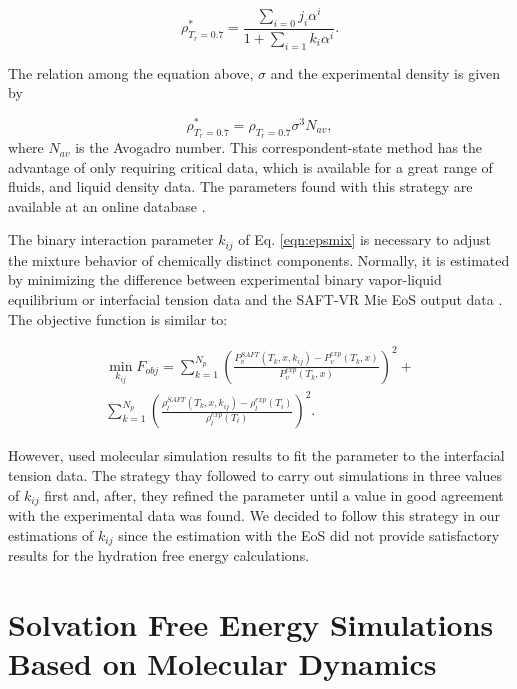 	\begin{equation}
	\rho_{T_{r}=0.7}^{*} = \frac{\sum_{i=0} j_{i}\alpha^{i}}{1+\sum_{i=1} k_{i}\alpha^{i}} .
	\label{eqn:denscorre}
	\end{equation}
	
	The relation among the equation above, $\sigma$ and the experimental density is given by
	
	\begin{equation}
	\rho_{T_{r}=0.7}^{*} = \rho_{T_{r}=0.7}\sigma^{3}N_{av},   
	\label{eqn:sigmacorre}
	\end{equation}
	where $N_{av}$ is the Avogadro number. This correspondent-state method has the advantage of only requiring critical data, which is available for a great range of fluids, and liquid density data. The parameters found with this strategy are available at an online database \cite{ervik2016}.     
	
	The binary interaction parameter $k_{ij}$ of Eq. \eqref{eqn:epsmix} is necessary to adjust the mixture behavior of chemically distinct components. Normally, it is estimated by minimizing the difference between experimental binary vapor-liquid equilibrium or interfacial tension data and the SAFT-VR Mie EoS output data \cite{muller2017,lobanova2016}. The objective function is similar to: 
	
	\begin{equation}
	\begin{aligned}
	\min\limits_{k_{ij}} F_{obj}= \sum_{k=1}^{N_{p}} \left(\frac{P_{v}^{SAFT}(T_{k},x,k_{ij})-P_{v}^{exp}(T_{k},x)}{P_{v}^{exp}(T_{k},x)} \right)^2 +\\
	\sum_{k=1}^{N_{p}} \left(\frac{\rho_{l}^{SAFT}(T_{k},x,k_{ij})-\rho_{l}^{exp}(T_{i})}{\rho_{l}^{exp}(T_{i})} \right)^2 .
	\end{aligned}
	\label{eqn:fobjmix}
	\end{equation}
	
	However,  used molecular simulation results to fit the parameter to the interfacial tension data. The strategy thay followed to carry out simulations in three values of $k_{ij}$ first and, after, they refined the parameter until a value in good agreement with the experimental data was found. We decided to follow this strategy in our estimations of $k_{ij}$ since the estimation with the EoS did not provide satisfactory results for the hydration free energy calculations.  
	
\section{Solvation Free Energy Simulations Based on Molecular Dynamics}
	
